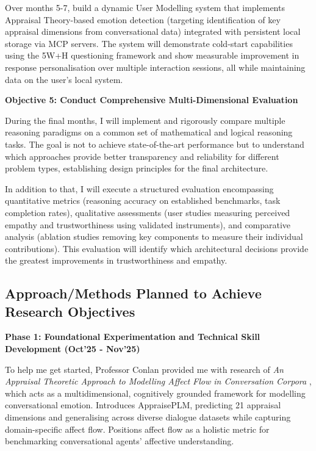 \documentclass[a4paper,oneside,12pt]{book}
\numberwithin{equation}{chapter} %
\begin{document}
Over months 5-7, build a dynamic User Modelling system that implements Appraisal Theory-based emotion detection (targeting identification of key appraisal dimensions from conversational data) \cite{debnath-etal-2025-appraisal} integrated with persistent local storage via MCP servers. The system will demonstrate cold-start capabilities using the 5W+H questioning framework and show measurable improvement in response personalisation over multiple interaction sessions, all while maintaining data on the user's local system.

\textbf{Objective 5: Conduct Comprehensive Multi-Dimensional Evaluation}

During the final months, I will implement and rigorously compare multiple reasoning paradigms on a common set of mathematical and logical reasoning tasks. The goal is not to achieve state-of-the-art performance but to understand which approaches provide better transparency and reliability for different problem types, establishing design principles for the final architecture.

In addition to that, I will execute a structured evaluation encompassing quantitative metrics (reasoning accuracy on established benchmarks, task completion rates), qualitative assessments (user studies measuring perceived empathy and trustworthiness using validated instruments), and comparative analysis (ablation studies removing key components to measure their individual contributions). This evaluation will identify which architectural decisions provide the greatest improvements in trustworthiness and empathy.

\subsection{Approach/Methods Planned to Achieve Research Objectives}

\textbf{Phase 1: Foundational Experimentation and Technical Skill Development (Oct'25 - Nov'25)}

To help me get started, Professor Conlan provided me with research of \textit{An Appraisal Theoretic Approach to Modelling Affect Flow in Conversation Corpora} \cite{debnath-etal-2025-appraisal}, which acts as a multidimensional, cognitively grounded framework for modelling conversational emotion. Introduces AppraisePLM, predicting 21 appraisal dimensions and generalising across diverse dialogue datasets while capturing domain-specific affect flow. Positions affect flow as a holistic metric for benchmarking conversational agents’ affective understanding.
\end{document}
